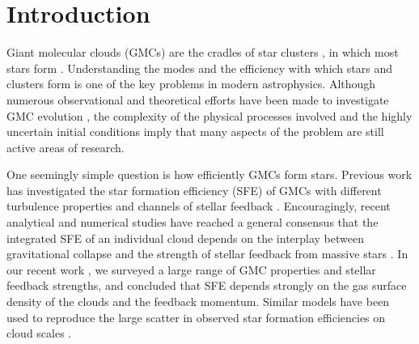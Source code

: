 \documentclass[fleqn,usenatbib]{mnras}
\begin{document}

\section{Introduction}
\label{sec:introduction}

Giant molecular clouds (GMCs) are the cradles of star clusters \citep{shu_star_1987, scoville_far-infrared_1989, mckee_theory_2007, krumholz_star_2019}, in which most stars form \citep[see][]{lada_embedded_2003}.
Understanding the modes and the efficiency with which stars and clusters form is one of the key problems in modern astrophysics.
Although numerous observational and theoretical efforts have been made to investigate GMC evolution \citep[see a recent review,][]{girichidis_physical_2020}, the complexity of the physical processes involved and the highly uncertain initial conditions imply that many aspects of the problem are still active areas of research.

One seemingly simple question is how efficiently GMCs form stars.
Previous work has investigated the star formation efficiency (SFE) of GMCs with different turbulence properties \citep[e.g.][]{krumholz_general_2005, padoan_simple_2012} and channels of stellar feedback \citep[e.g.][]{dale_ionizing_2012, walch_dispersal_2012, rogers_feedback_2013, dale_before_2014, myers_star_2014, geen_photoionization_2015, kim_modeling_2017, lucas_supernova_2020}.
Encouragingly, recent analytical and numerical studies have reached a general consensus that the integrated SFE of an individual cloud depends on the interplay between gravitational collapse and the strength of stellar feedback from massive stars \citep[e.g.][]{fall_stellar_2010, murray_disruption_2010, burkert_dependence_2013, raskutti_numerical_2016, grudic_when_2018}.
In our recent work \citep[][hereafter L19]{li_disruption_2019}, we surveyed a large range of GMC properties and stellar feedback strengths, and concluded that SFE depends strongly on the gas surface density of the clouds and the feedback momentum.
Similar models have been used to reproduce the large scatter in observed star formation efficiencies on cloud scales \citep[e.g.][]{grudic_nature_2019}.
\end{document}

